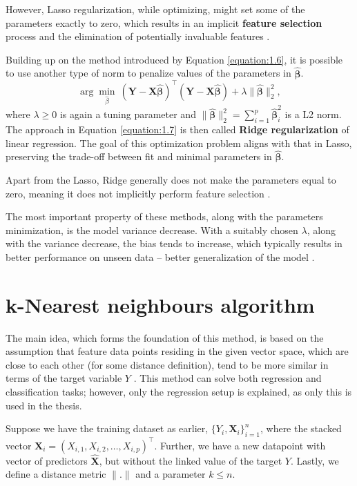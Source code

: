 However, Lasso regularization, while optimizing, might set some of the parameters exactly to zero, which results in an implicit \textbf{feature selection} process and the elimination of potentially invaluable features \cite{islp}. 
\newline
\par
Building up on the method introduced by Equation \eqref{equation:1.6}, it is possible to use another type of norm to penalize values of the parameters in $\bm{\hat{\beta}}$.
\begin{equation}
    \label{equation:1.7}
    \arg \min_{\hat{\beta}} \> (\bm{Y} - \textbf{X}\bm{\hat{\beta}})^\top(\bm{Y} - \textbf{X}\bm{\hat{\beta}}) + \lambda \|\bm{\hat{\beta}}\|_2^2,
\end{equation}
where $\lambda \geq 0$ is again a tuning parameter and $\|\bm{\hat{\beta}}\|_2^2 = \sum_{i=1}^{p}\bm{\hat{\beta}}^2_{i}$ is a L2 norm. The approach in Equation \eqref{equation:1.7} is then called \textbf{Ridge regularization} of linear regression.
The goal of this optimization problem aligns with that in Lasso, preserving the trade-off between fit and minimal parameters in $\bm{\hat{\beta}}$. 

Apart from the Lasso, Ridge generally does not make the parameters equal to zero, meaning it does not implicitly perform feature selection \cite{islp}.

The most important property of these methods, along with the parameters minimization, is the model variance decrease. With a suitably chosen $\lambda$, along with the variance decrease, the bias tends to increase, which typically results in 
better performance on unseen data – better generalization of the model \cite{islp}.   

\section{k-Nearest neighbours algorithm}

The main idea, which forms the foundation of this method, is based on the assumption that feature data points residing in the given vector space, which
are close to each other (for some distance definition), tend to be more similar in terms of the target variable $Y$ \cite{skiena}. This method can solve both regression and classification tasks; however, 
only the regression setup is explained, as only this is used in the thesis.

Suppose we have the training dataset as earlier, $\{ Y_i, \bm{X}_i \}_{i=1}^{n}$, where the stacked vector $\bm{X}_i = (X_{i, 1}, X_{i, 2}, \ldots, X_{i, p})^\top$.
Further, we have a new datapoint with vector of predictors $\bm{\hat{X}}$, but without the linked value of the target $Y$. Lastly, we define a distance metric $\|.\|$ and a parameter $k \leq n$.

